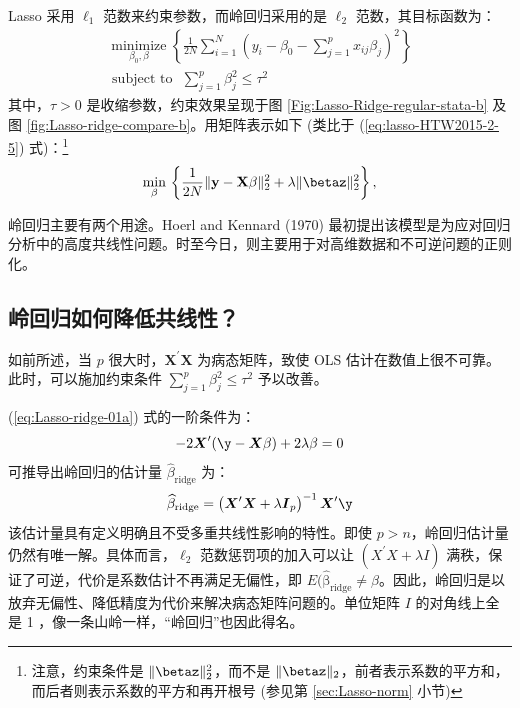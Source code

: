 Lasso 采用 $\ell_{1}$ 范数来约束参数，而岭回归采用的是 $\ell_{2}$ 范数，其目标函数为：
\begin{equation}\label{eq:Lasso-ridge-01}
	\begin{gathered}
	\underset{\beta_{0}, \beta}{\operatorname{minimize}}\left\{\frac{1}{2 N} \sum_{i=1}^{N}\left(y_{i}-\beta_{0}-\sum_{j=1}^{p} x_{i j} \beta_{j}\right)^{2}\right\} \\
	\text { subject to }\,\, \sum_{j=1}^{p} \beta_{j}^{2} \leq \tau^{2}
	\end{gathered} 
\end{equation}
其中，$\tau>0$ 是收缩参数，约束效果呈现于图 \ref{Fig:Lasso-Ridge-regular-stata-b} 及图 \ref{fig:Lasso-ridge-compare-b}。用矩阵表示如下 (类比于 (\ref{eq:lasso-HTW2015-2-5}) 式)：\footnote{%
  注意，约束条件是 $\|\betaz\|_{2}^2$，而不是 $\|\betaz\|_{2}$，前者表示系数的平方和，而后者则表示系数的平方和再开根号 (参见第 \ref{sec:Lasso-norm} 小节)}
\begin{equation}\label{eq:Lasso-ridge-01a}
\underset{\beta}{\operatorname{min}}\,
\left\{\frac{1}{2 N}\|\mathbf{y}-\mathbf{X} \beta\|_{2}^{2}+\lambda\|\betaz\|_{2}^2\right\},
\end{equation}






岭回归主要有两个用途。Hoerl and Kennard (1970) 最初提出该模型是为应对回归分析中的高度共线性问题。时至今日，则主要用于对高维数据和不可逆问题的正则化。

\subsection{岭回归如何降低共线性？}
如前所述，当 $p$ 很大时，$\boldsymbol{X}^{\prime} \boldsymbol{X}$ 为病态矩阵，致使 OLS 估计在数值上很不可靠。此时，可以施加约束条件 $\sum_{j=1}^{p} \beta_{j}^{2} \leq \tau^{2}$ 予以改善。

(\ref{eq:Lasso-ridge-01a}) 式的一阶条件为：
$$
-2 \boldsymbol{X}^{\prime}(\boldsymbol{\y}-\boldsymbol{X} \beta)+2 \lambda \beta=0
$$
可推导出岭回归的估计量 $\widehat{\beta}_{\text {ridge}}$ 为：
\begin{equation}\label{eq:Lasso-21}
	\widehat{\beta}_{\text {ridge}} =\left(\boldsymbol{X}^{\prime} \boldsymbol{X}+\lambda \boldsymbol{I}_{p}\right)^{-1} \boldsymbol{X}^{\prime} \boldsymbol{\y}
\end{equation}
该估计量具有定义明确且不受多重共线性影响的特性。即使 $p>n$，岭回归估计量仍然有唯一解。具体而言，$\ell_{2}$ 范数惩罚项的加入可以让 $\left(X^{\prime} X+\lambda I\right)$ 满秩，保证了可逆，代价是系数估计不再满足无偏性，即 $E(\mathrm{\widehat{\beta}_{\text {ridge}}} \neq \beta$。因此，岭回归是以放弃无偏性、降低精度为代价来解决病态矩阵问题的。单位矩阵 $I$ 的对角线上全是 1 ，像一条山岭一样，“岭回归”也因此得名。

